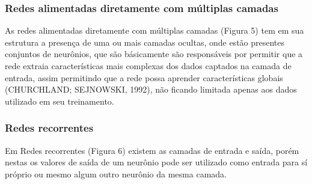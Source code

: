 
\subsubsection{Redes alimentadas diretamente com múltiplas camadas}

As redes alimentadas diretamente com múltiplas camadas (Figura 5) tem em sua estrutura a presença de uma ou mais camadas ocultas, onde estão presentes conjuntos de neurônios, que são básicamente são responsáveis por permitir que a rede extraia características mais complexas dos dados captados na camada de entrada, assim permitindo que a rede possa aprender características globais (CHURCHLAND; SEJNOWSKI, 1992), não ficando limitada apenas aos dados utilizado em seu treinamento.



\subsubsection{Redes recorrentes}

Em Redes recorrentes (Figura 6) existem as camadas de entrada e saída, porém nestas os valores de saída de um neurônio pode ser utilizado como entrada para sí próprio ou mesmo algum outro neurônio da mesma camada.




